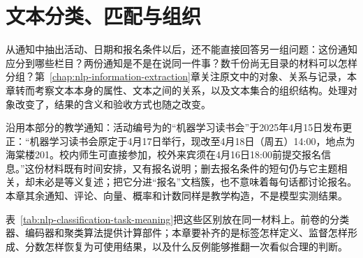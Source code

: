 \chapter{文本分类、匹配与组织}
\label{chap:nlp-classification-matching-organization}

从通知中抽出活动、日期和报名条件以后，还不能直接回答另一组问题：这份通知应分到哪些栏目？两份通知是不是在说同一件事？数千份尚无目录的材料可以怎样分组？第~\ref{chap:nlp-information-extraction}章关注原文中的对象、关系与记录，本章转而考察文本本身的属性、文本之间的关系，以及文本集合的组织结构。处理对象改变了，结果的含义和验收方式也随之改变。

沿用本部分的教学通知：活动编号为的“机器学习读书会”于2025年4月15日发布更正：“机器学习读书会原定于4月17日举行，现改至4月18日（周五）14:00，地点为海棠楼201。校内师生可直接参加，校外来宾须在4月16日18:00前提交报名信息。”这份材料既有时间安排，又有报名说明；删去报名条件的短句仍与它主题相关，却未必是等义复述；把它分进“报名”文档簇，也不意味着每句话都讨论报名。本章其余通知、评论、向量、概率和计数同样是教学构造，不是模型实测结果。

表~\ref{tab:nlp-classification-task-meaning}把这些区别放在同一材料上。前卷的分类器、编码器和聚类算法提供计算部件；本章要补齐的是标签怎样定义、监督怎样形成、分数怎样恢复为可使用结果，以及什么反例能够推翻一次看似合理的判断。

